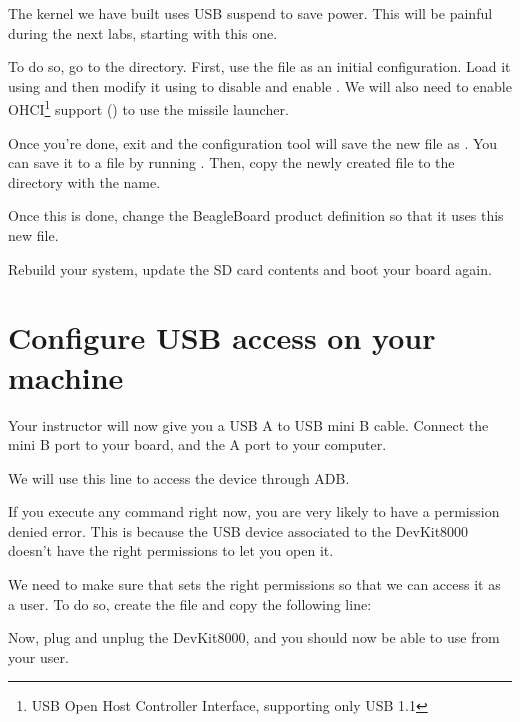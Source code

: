 The kernel we have built uses USB suspend to save power. This will
be painful during the next labs, starting with this one.

To do so, go to the  directory. First, use the
 file as an initial configuration. Load
it using  and then modify
it using  to disable
 and enable
. We will also need to enable
OHCI\footnote{USB Open Host Controller Interface, supporting only USB
  1.1} support () to use the missile
launcher.

Once you're done, exit and the configuration tool will save the new
file as . You can save it to a  file by
running . Then, copy the newly
created  file to the  directory
with the  name.

Once this is done, change the BeagleBoard product definition so that
it uses this new file.

Rebuild your system, update the SD card contents and boot your board
again.

\section{Configure USB access on your machine}

Your instructor will now give you a USB A to USB mini B cable.
Connect the mini B port to your board, and the A port to your computer.

We will use this line to access the device through ADB. 

If you execute any command right now, you are very likely to have a
permission denied error. This is because the USB device associated to
the DevKit8000 doesn't have the right permissions to let you open it.

We need to make sure that  sets the right permissions so
that we can access it as a user. To do so, create the file
 and copy the following line:


Now, plug and unplug the DevKit8000, and you should now be able to use
 from your user.

